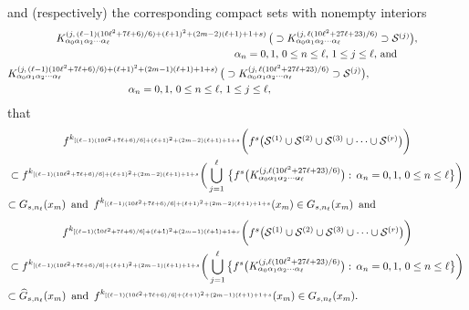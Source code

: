 \documentclass[12pt]{article}
\newcommand{\al}{\alpha}
\begin{document}
and (respectively) the corresponding compact sets with nonempty interiors 
\begin{multline*}
$$
K_{\al_0\al_1\al_2\cdots\al_\ell}^{(j, \, (\ell-1)(10\ell^2+7\ell+6)/6)+(\ell+1)^2+(2m-2)(\ell+1)+1+s)} \, \big(\supset K_{\al_0\al_1\al_2\cdots\al_\ell}^{(j, \, \ell(10\ell^2+27\ell+23)/6)} \supset \mathcal S^{(j)}\big), \\
\qquad\qquad\qquad\qquad\qquad\qquad\qquad\quad\, \al_n = 0, 1, \, 0 \le n \le \ell, \, 1 \le j \le \ell, \, \text{and} \\ 
K_{\al_0\al_1\al_2\cdots\al_\ell}^{(j, \, (\ell-1)(10\ell^2+7\ell+6)/6)+(\ell+1)^2+(2m-1)(\ell+1)+1+s)} \, \big(\supset K_{\al_0\al_1\al_2\cdots\al_\ell}^{(j, \, \ell(10\ell^2+27\ell+23)/6)} \supset \mathcal S^{(j)}\big), \qquad\qquad\qquad\qquad\quad\,\,\\
\al_n = 0, 1, \, 0 \le n \le \ell, \, 1 \le j \le \ell, \qquad\qquad\qquad\quad\,
$$
\end{multline*}
that 
\begin{multline*}
$$
f^{k_{[(\ell-1)(10\ell^2+7\ell+6)/6]+(\ell+1)^2+(2m-2)(\ell+1)+1+s}}\bigg(f^s\big(\mathcal S^{(1)} \cup \mathcal S^{(2)} \cup \mathcal S^{(3)} \cup \cdots \cup \mathcal S^{(r)}\big)\bigg) \\
\subset f^{k_{[(\ell-1)(10\ell^2+7\ell+6)/6]+(\ell+1)^2+(2m-2)(\ell+1)+1+s}}\bigg(\bigcup_{j=1}^\ell \, \big\{ f^s\big(K_{\al_0\al_1\al_2\cdots\al_\ell}^{(j, \ell(10\ell^2+27\ell+23)/6)}\big): \, \al_n = 0, 1, \, 0 \le n \le \ell \big\}\bigg) \\ 
\subset G_{s,n_\ell}(x_m) \,\,\, \text{and} \,\,\, f^{k_{[(\ell-1)(10\ell^2+7\ell+6)/6]+(\ell+1)^2+(2m-2)(\ell+1)+1+s}}(x_m) \in G_{s,n_\ell}(x_m) \,\,\, \text{and}\qquad\qquad\qquad\qquad\,\,\,
$$
\end{multline*}
\begin{multline*}
$$
f^{k_{[(\ell-1)(10\ell^2+7\ell+6)/6]+(\ell+1)^2+(2m-1)(\ell+1)+1+s}}\bigg(f^s\big(\mathcal S^{(1)} \cup \mathcal S^{(2)} \cup \mathcal S^{(3)} \cup \cdots \cup \mathcal S^{(r)}\big)\bigg) \\
\subset f^{k_{[(\ell-1)(10\ell^2+7\ell+6)/6]+(\ell+1)^2+(2m-1)(\ell+1)+1+s}}\bigg(\bigcup_{j=1}^\ell  \big\{ f^s\big(K_{\al_0\al_1\al_2\cdots\al_\ell}^{(j, \ell(10\ell^2+27\ell+23)/6)}\big): \, \al_n = 0, 1, \, 0 \le n \le \ell \big\}\bigg) \\ 
\subset \widehat G_{s,n_\ell}(x_m) \,\,\, \text{and} \,\,\, f^{k_{[(\ell-1)(10\ell^2+7\ell+6)/6]+(\ell+1)^2+(2m-1)(\ell+1)+1+s}}(x_m) \in G_{s,n_\ell}(x_m).\qquad\qquad\qquad\qquad\qquad\,
$$
\end{multline*}
\end{document}

